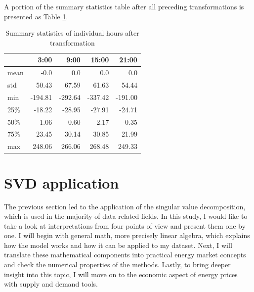 \documentclass{article}
\begin{document}
A portion of the summary statistics table after all preceding transformations is presented as Table \ref{tab: Table 2}.
\begin{table}[H]
  \centering
  \caption{Summary statistics of individual hours after transformation}
    \begin{tabular}{lrrrr}
      \toprule
       & 3:00 & 9:00 & 15:00 & 21:00 \\
      \midrule
    mean & -0.0 & 0.0 & 0.0 & 0.0 \\
    std & 50.43 & 67.59 & 61.63 & 54.44 \\
    min & -194.81 & -292.64 & -337.42 & -191.00 \\
    25\% & -18.22 & -28.95 & -27.91 & -24.71 \\
    50\% & 1.06 & 0.60 & 2.17 & -0.35 \\
    75\% & 23.45 & 30.14 & 30.85 & 21.99 \\
    max & 248.06 & 266.06 & 268.48 & 249.33 \\
    \bottomrule
    \end{tabular}
  \label{tab: Table 2}
\end{table}

\section{SVD application}
The previous section led to the application of the singular value decomposition, which is used in the majority of data-related fields.
In this study, I would like to take a look at interpretations from four points of view and present them one by one.
I will begin with general math, more precisely linear algebra, which explains how the model works and how it can be applied to my dataset.
Next, I will translate these mathematical components into practical energy market concepts and check the numerical properties of the methods.
Lastly, to bring deeper insight into this topic, I will move on to the economic aspect of energy prices with supply and demand tools.
\end{document}
